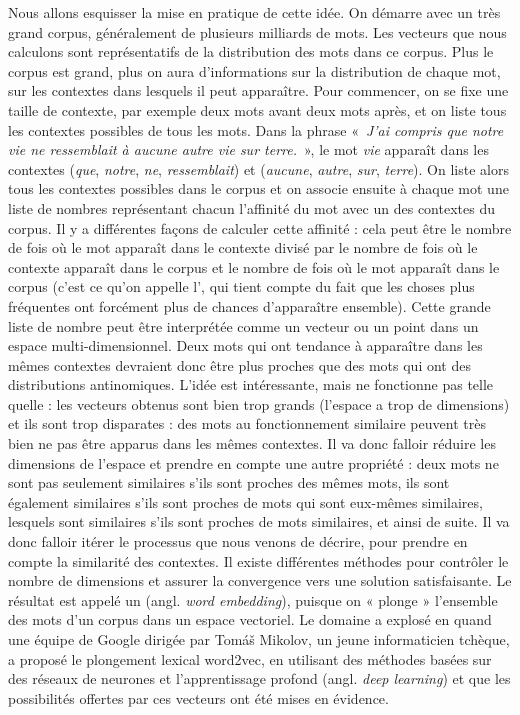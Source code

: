 {Nous allons esquisser la mise en pratique de cette idée. On démarre avec un très grand corpus, généralement de plusieurs milliards de mots. Les vecteurs que nous calculons sont représentatifs de la distribution des mots dans ce corpus. Plus le corpus est grand, plus on aura d’informations sur la distribution de chaque mot, sur les contextes dans lesquels il peut apparaître. Pour commencer, on se fixe une taille de contexte, par exemple deux mots avant deux mots après, et on liste tous les contextes possibles de tous les mots. Dans la phrase «~\textit{J’ai compris que notre vie ne ressemblait à aucune autre vie sur terre.}~», le mot \textit{vie} apparaît dans les contextes (\textit{que}, \textit{notre}, \textit{ne}, \textit{ressemblait}) et (\textit{aucune}, \textit{autre}, \textit{sur}, \textit{terre}). On liste alors tous les contextes possibles dans le corpus et on associe ensuite à chaque mot une liste de nombres représentant chacun l’affinité du mot avec un des contextes du corpus. Il y a différentes façons de calculer cette affinité : cela peut être le nombre de fois où le mot apparaît dans le contexte divisé par le nombre de fois où le contexte apparaît dans le corpus et le nombre de fois où le mot apparaît dans le corpus (c’est ce qu’on appelle l’, qui tient compte du fait que les choses plus fréquentes ont forcément plus de chances d’apparaître ensemble). Cette grande liste de nombre peut être interprétée comme un vecteur ou un point dans un espace multi-dimensionnel. Deux mots qui ont tendance à apparaître dans les mêmes contextes devraient donc être plus proches que des mots qui ont des distributions antinomiques. L’idée est intéressante, mais ne fonctionne pas telle quelle : les vecteurs obtenus sont bien trop grands
(l’espace a trop de dimensions) et ils sont trop disparates : des mots au fonctionnement similaire peuvent très bien ne pas être apparus dans les mêmes contextes. Il va donc falloir réduire les dimensions de l’espace et prendre en compte une autre propriété : deux mots ne sont pas seulement similaires s’ils sont proches des mêmes mots, ils sont également similaires s’ils sont proches de mots qui sont eux-mêmes similaires, lesquels sont similaires s'ils sont proches de mots similaires, et ainsi de suite. Il va donc falloir itérer le processus que nous venons de décrire, pour prendre en compte la similarité des contextes. Il existe différentes méthodes pour contrôler le nombre de dimensions et assurer la convergence vers une solution satisfaisante. Le résultat est appelé
un  (angl. \textit{word embedding}), puisque on « plonge » l’ensemble des mots d’un corpus dans un espace vectoriel. Le domaine a explosé en \citeyear{mikolov2013distributed} quand une équipe de Google dirigée par Tomáš Mikolov, un jeune informaticien tchèque, a proposé le plongement lexical word2vec, en utilisant des méthodes basées sur des réseaux de neurones et l’apprentissage profond (angl. \textit{deep learning}) et que les possibilités offertes par ces vecteurs ont été mises en évidence.

}
